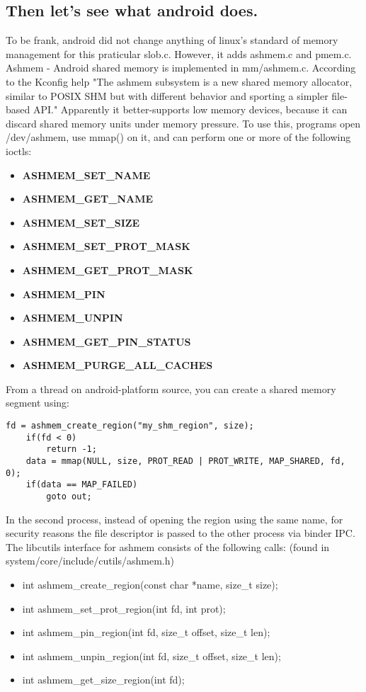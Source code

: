 \documentclass[12pt,letterpaper]{article}
\begin{document}
\subsection{Then let's see what android does.}
 \indent To be frank, android did not change anything of linux's standard of memory management for this praticular slob.c. However, it adds ashmem.c and pmem.c.\newline
 \indent Ashmem - Android shared memory is implemented in mm/ashmem.c. According to the Kconfig help "The ashmem subsystem is a new shared memory allocator, similar to POSIX SHM but with different behavior and sporting a simpler file-based API." Apparently it better-supports low memory devices, because it can discard shared memory units under memory pressure. To use this, programs open /dev/ashmem, use mmap() on it, and can perform one or more of the following ioctls:
\begin{itemize}
\item \textbf{ASHMEM_SET_NAME} 
\item \textbf{ASHMEM_GET_NAME}
\item \textbf{ASHMEM_SET_SIZE} 
\item \textbf{ASHMEM_SET_PROT_MASK}
\item \textbf{ASHMEM_GET_PROT_MASK}
\item \textbf{ASHMEM_PIN}
\item \textbf{ASHMEM_UNPIN}
\item \textbf{ASHMEM_GET_PIN_STATUS}
\item \textbf{ASHMEM_PURGE_ALL_CACHES}
\end{itemize}
From a thread on android-platform source, you can create a shared memory segment using:
\begin{Verbatim}[frame=single]
  fd = ashmem_create_region("my_shm_region", size); 
    if(fd < 0) 
        return -1; 
    data = mmap(NULL, size, PROT_READ | PROT_WRITE, MAP_SHARED, fd, 0); 
    if(data == MAP_FAILED) 
        goto out; 
\end{Verbatim}
In the second process, instead of opening the region using the same name, for security reasons the file descriptor is passed to the other process via binder IPC.\newline
The libcutils interface for ashmem consists of the following calls: (found in system/core/include/cutils/ashmem.h)
\begin{itemize}
\item int ashmem_create_region(const char *name, size_t size);
\item int ashmem_set_prot_region(int fd, int prot);
\item int ashmem_pin_region(int fd, size_t offset, size_t len);
\item int ashmem_unpin_region(int fd, size_t offset, size_t len);
\item int ashmem_get_size_region(int fd);
\end{itemize}
\end{document}
